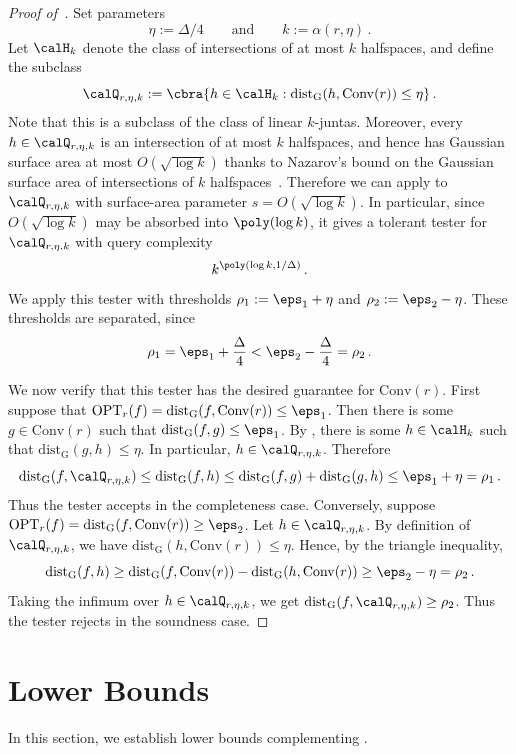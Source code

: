 \documentclass[11pt]{article}
\newcommand{\dG}{\mathrm{dist}_{\mathrm{G}}}
\newcommand{\Conv}{\mathrm{Conv}}
\newcommand{\OPT}{\mathrm{OPT}}
\begin{document}
\begin{proof}[Proof of~]
	Set parameters 
	\[
		\eta := \Delta/4
		\qquad\text{and}\qquad
		k := \alpha(r,\eta)\,.
	\]
	Let $\calH_k$ denote the class of intersections of at most $k$ halfspaces, and define the subclass
	\[
		\calQ_{r,\eta,k}
		:=
		\cbra{
			h\in\calH_k:
			\dG(h,\Conv(r))\leq \eta
		}\,.
	\]
	Note that this is a subclass of the class of linear $k$-juntas.
	Moreover, every $h\in\calQ_{r,\eta,k}$ is an intersection of at most $k$ halfspaces, and hence has Gaussian surface area at most $O(\sqrt{\log k})$ thanks to Nazarov's bound on the Gaussian surface area of intersections of $k$ halfspaces~\cite[Theorem~20]{KOS:08}. 
	Therefore we can apply \cite[Theorem~1.2]{DMN21} to $\calQ_{r,\eta,k}$ with surface-area parameter $s=O(\sqrt{\log k})$. 
	In particular, since $O(\sqrt{\log k})$ may be absorbed into $\poly(\log k)$, it gives a tolerant tester for $\calQ_{r,\eta,k}$ with query complexity
	\[
		k^{\poly(\log k,1/\Delta)}\,.
	\]
	We apply this tester with thresholds $\rho_1 := \eps_1+\eta$ and $\rho_2 := \eps_2-\eta$. 
	These thresholds are separated, since
	\[
		\rho_1
		=
		\eps_1+\frac{\Delta}{4}
		<
		\eps_2-\frac{\Delta}{4}
		=
		\rho_2\,.
	\]
	
	We now verify that this tester has the desired guarantee for $\Conv(r)$.
	First suppose that $\OPT_r(f)=\dG(f,\Conv(r))\leq \eps_1$. 
	Then there is some $g\in\Conv(r)$ such that $\dG(f,g)\leq \eps_1$.
	By , there is some $h\in\calH_k$ such that $\dG(g,h)\leq \eta$. 
	In particular, $h\in\calQ_{r,\eta,k}$.
	Therefore
	\[
		\dG(f,\calQ_{r,\eta,k})
		\leq
		\dG(f,h)
		\leq
		\dG(f,g)+\dG(g,h)
		\leq
		\eps_1+\eta
		=
		\rho_1\,.
	\]
	Thus the tester accepts in the completeness case. 
	Conversely, suppose $\OPT_r(f)=\dG(f,\Conv(r))\geq \eps_2$. 
	Let $h\in\calQ_{r,\eta,k}$.
	By definition of $\calQ_{r,\eta,k}$, we have $\dG(h,\Conv(r))\leq \eta$. 
	Hence, by the triangle inequality,
	\[
		\dG(f,h)
		\geq
		\dG(f,\Conv(r))-\dG(h,\Conv(r))
		\geq
		\eps_2-\eta
		=
		\rho_2\,.
	\]
	Taking the infimum over $h\in\calQ_{r,\eta,k}$, we get $\dG(f,\calQ_{r,\eta,k})
		\geq
		\rho_2$.
	Thus the tester rejects in the soundness case.
\end{proof}

\section{Lower Bounds}
\label{sec:lbs}

In this section, we establish lower bounds complementing
. 
\end{document}

